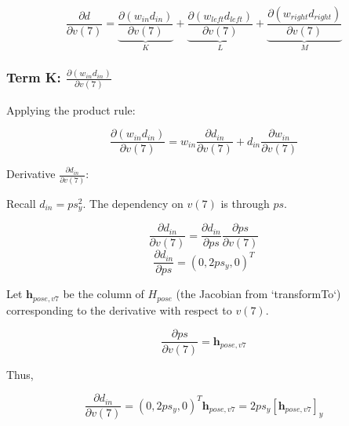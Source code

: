 \documentclass[11pt]{article}
\begin{document}
            \begin{equation}
                \frac{\partial d}{\partial v(7)} = \underbrace{ \frac{\partial (w_{in}d_{in}) }{\partial v(7)}}_{K} +
                \underbrace{ \frac{\partial (w_{left}d_{left}) }{\partial v(7)}}_{L} +
                \underbrace{ \frac{\partial (w_{right}d_{right}) }{\partial v(7)}}_{M}
            \end{equation}

            \subsubsection*{Term K: $\frac{\partial (w_{in} d_{in})}{\partial v(7)}$}

            Applying the product rule:

            \begin{equation}
                \frac{\partial (w_{in} d_{in})}{\partial v(7)} = w_{in} \frac{\partial d_{in}}{\partial v(7)} + d_{in} \frac{\partial w_{in}}{\partial v(7)}
            \end{equation}

            Derivative $\frac{\partial d_{in}}{\partial v(7)}$:

            Recall $d_{in} = ps_{y}^2$. The dependency on $v(7)$ is through $ps$.

            \begin{equation}
                \frac{\partial d_{in}}{\partial v(7)} = \frac{\partial d_{in}}{\partial ps} \frac{\partial ps}{\partial v(7)}
            \end{equation}
            \begin{equation}
                \frac{\partial d_{in}}{\partial ps} = (0, 2ps_{y}, 0)^T
            \end{equation}

            Let $\mathbf{h}_{pose,v7}$ be the column of $H_{pose}$ (the Jacobian from `transformTo`) corresponding to the derivative with respect to $v(7)$.

            \begin{equation}
                \frac{\partial ps}{\partial v(7)} = \mathbf{h}_{pose,v7}
            \end{equation}

            Thus,

            \begin{equation}
                \frac{\partial d_{in}}{\partial v(7)} =  (0, 2ps_{y}, 0)^T \mathbf{h}_{pose,v7} = 2 ps_{y} [\mathbf{h}_{pose,v7}]_y
            \end{equation}
\end{document}

